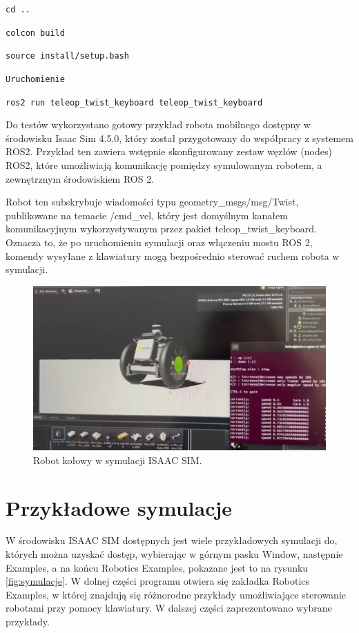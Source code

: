 \documentclass[12pt]{article}
\begin{document}
\texttt{cd ..}

\texttt{colcon build}

\texttt{source install/setup.bash}

\texttt{Uruchomienie}

\texttt{ros2 run teleop\_twist\_keyboard teleop\_twist\_keyboard}

Do testów wykorzystano gotowy przykład robota mobilnego dostępny w środowisku Isaac Sim 4.5.0, który został przygotowany do współpracy z systemem ROS2. Przykład ten zawiera wstępnie skonfigurowany zestaw węzłów (nodes) ROS2, które umożliwiają komunikację pomiędzy symulowanym robotem, a zewnętrznym środowiskiem ROS 2.

Robot ten subskrybuje wiadomości typu geometry\_msgs/msg/Twist, publikowane na temacie /cmd\_vel, który jest domyślnym kanałem komunikacyjnym wykorzystywanym przez pakiet teleop\_twist\_keyboard. Oznacza to, że po uruchomieniu symulacji oraz włączeniu mostu ROS 2, komendy wysyłane z klawiatury mogą bezpośrednio sterować ruchem robota w symulacji.

\begin{figure}[h]
    \centering
    \includegraphics[width=0.5\linewidth]{Zdjęcia/robocikRos2.png}
    \caption{Robot kołowy w symulacji ISAAC SIM.}
    \label{fig:robotKolowy}
\end{figure}

\section{Przykładowe symulacje}

W środowisku ISAAC SIM dostępnych jest wiele przykładowych symulacji do, których można uzyskać dostęp, wybierając w górnym pasku Window, następnie Examples, a na końcu Robotics Examples, pokazane jest to na rysunku \ref{fig:symulacje}.
W dolnej części programu otwiera się zakładka Robotics Examples, w której znajdują się różnorodne przykłady umożliwiające sterowanie robotami przy pomocy klawiatury. W dalszej części zaprezentowano wybrane przykłady.
\end{document}

